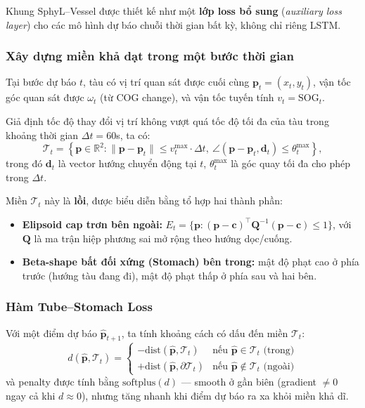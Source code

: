 \documentclass{IEEEtran}
\newcommand{\R}{\mathbb{R}}
\begin{document}
Khung SphyL--Vessel được thiết kế như một \textbf{lớp loss bổ sung}
(\textit{auxiliary loss layer}) cho các mô hình dự báo chuỗi thời gian
bất kỳ, không chỉ riêng LSTM.

\subsubsection{Xây dựng miền khả dạt trong một bước thời gian}
Tại bước dự báo $t$, tàu có vị trí quan sát được cuối cùng
$\mathbf{p}_t = (x_t, y_t)$, vận tốc góc quan sát được
$\omega_t$ (từ COG change), và vận tốc tuyến tính $v_t = \text{SOG}_t$.

Giả định tốc độ thay đổi vị trí không vượt quá tốc độ tối đa của tàu
trong khoảng thời gian $\Delta t = 60$s, ta có:
\[
\mathcal{T}_t = \left\{
  \mathbf{p} \in \R^2 :
  \|\mathbf{p} - \mathbf{p}_t\| \leq v_t^{\max} \cdot \Delta t,
  \ \angle(\mathbf{p} - \mathbf{p}_t, \mathbf{d}_t) \leq \theta_t^{\max}
\right\},
\]
trong đó $\mathbf{d}_t$ là vector hướng chuyển động tại $t$,
$\theta_t^{\max}$ là góc quay tối đa cho phép trong $\Delta t$.

Miền $\mathcal{T}_t$ này là \textbf{lồi}, được biểu diễn bằng
tổ hợp hai thành phần:
\begin{itemize}
  \item \textbf{Elipsoid cap trơn bên ngoài:}
        $E_t = \{\mathbf{p} : (\mathbf{p}-\mathbf{c})^\top\mathbf{Q}^{-1}(\mathbf{p}-\mathbf{c}) \leq 1\}$,
        với $\mathbf{Q}$ là ma trận hiệp phương sai mở rộng theo hướng dọc/cuống.
  \item \textbf{Beta-shape bất đối xứng (Stomach) bên trong:}
        mật độ phạt cao ở phía trước (hướng tàu đang đi),
        mật độ phạt thấp ở phía sau và hai bên.
\end{itemize}

\subsubsection{Hàm Tube--Stomach Loss}
Với một điểm dự báo $\hat{\mathbf{p}}_{t+1}$, ta tính
khoảng cách có dấu đến miền $\mathcal{T}_t$:
\[
d(\hat{\mathbf{p}}, \mathcal{T}_t) =
\begin{cases}
  -\text{dist}(\hat{\mathbf{p}}, \mathcal{T}_t) & \text{nếu } \hat{\mathbf{p}} \in \mathcal{T}_t \text{ (trong)}\\[4pt]
  +\text{dist}(\hat{\mathbf{p}}, \partial\mathcal{T}_t) & \text{nếu } \hat{\mathbf{p}} \notin \mathcal{T}_t \text{ (ngoài)}
\end{cases}
\]
và penalty được tính bằng $\text{softplus}(d)$ ---
smooth ở gần biên (gradient $\neq 0$ ngay cả khi $d \approx 0$),
nhưng tăng nhanh khi điểm dự báo ra xa khỏi miền khả dĩ.
\end{document}
